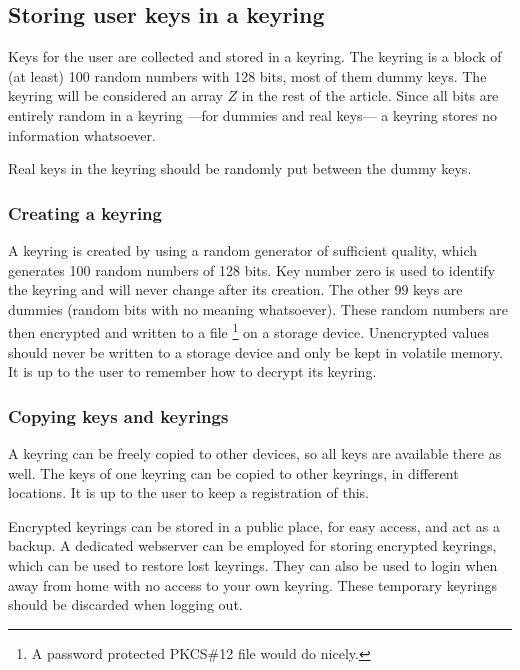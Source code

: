 \subsection{Storing user keys in a keyring}
\label{sec:keyring}
Keys for the user are collected and stored in a keyring.
The keyring is a block of
(at least)
100 random numbers with 128 bits, most of them dummy keys.
The keyring will be considered an array $Z$ in the rest of the article.
Since all bits are entirely random in a keyring%
---for dummies and real keys---%
a keyring stores no information whatsoever.
\par
Real keys in the keyring should be randomly put between the dummy keys.

\subsubsection{Creating a keyring}
A keyring is created by using a random generator of sufficient quality,
which generates 100 random numbers of 128 bits.
Key number zero is used to identify the keyring and will never change after its creation.
The other 99 keys are dummies
(random bits with no meaning whatsoever).
These random numbers are then encrypted and written to a file%
\footnote{A password protected PKCS\#12 file would do nicely.}
on a storage device.
Unencrypted values should never be written to a storage device and only be kept in volatile memory.
It is up to the user to remember how to decrypt its keyring.

\subsubsection{Copying keys and keyrings}
A keyring can be freely copied to other devices, so all keys are available there as well.
The keys of one keyring can be copied to other keyrings, in different locations.
It is up to the user to keep a registration of this.
\par
Encrypted keyrings can be stored in a public place, for easy access, and act as a backup.
A dedicated webserver can be employed for storing encrypted keyrings,
which can be used to restore lost keyrings.
They can also be used to login when away from home with no access to your own keyring.
These temporary keyrings should be discarded when logging out.

